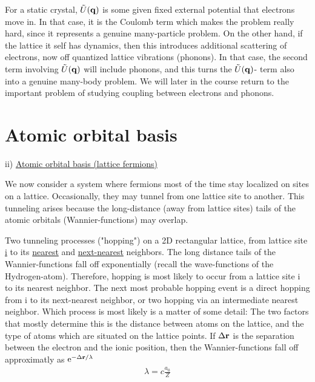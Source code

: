 \noindent For a static crystal, $\tilde{U}(\vb{q})$ is some given fixed external potential that electrons move in. In that case, it is the Coulomb term which makes the problem really hard, since it represents a genuine many-particle problem. On the other hand, if the lattice it self has dynamics, then this introduces additional scattering of electrons, now off quantized lattice vibrations (phonons). In that case, the second term involving $\tilde{U}(\vb{q})$ will include phonons, and this turns the $\tilde{U}(\vb{q})$- term also into a genuine many-body problem. We will later in the course return to the important problem of studying coupling between electrons and phonons.\newline

\section{Atomic orbital basis}

\noindent ii) \uline{Atomic orbital basis (lattice fermions)}

\noindent We now consider a system where fermions most of the time stay localized on sites on a lattice. Occasionally, they may tunnel from one lattice site to another. This tunneling arises because the long-distance (away from lattice sites) tails of the atomic orbitals (Wannier-functions) may overlap.

\begin{center}
\end{center}
\noindent Two tunneling processes ("hopping") on a 2D rectangular lattice, from lattice site \uline{i} to its \uline{nearest} and \uline{next-nearest} neighbors. The long distance tails of the Wannier-functions fall off exponentially (recall the wave-functions of the Hydrogen-atom). Therefore, hopping is most likely to occur from a lattice site i to its nearest neighbor. The next most probable hopping event is a direct hopping from i to its next-nearest neighbor, or two hopping via an intermediate nearest neighbor. Which process is most likely is a matter of some detail: The two factors that mostly determine this is the distance between atoms on the lattice, and the type of atoms which are situated on the lattice points. If $\Delta \vb{r}$ is the separation between the electron and the ionic position, then the Wannier-functions fall off approximatly as $\mathrm{e}^{-\Delta \vb{r}/\lambda}$
\begin{align*}
	\lambda = c \frac{a_0}{Z}
\end{align*}

